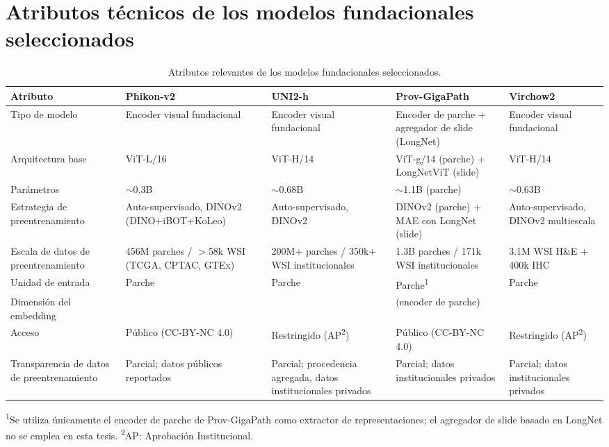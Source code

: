 \chapter{Atributos técnicos de los modelos fundacionales seleccionados}
\label{apx:atributos_modelos}

\begin{table}[htbp]
\centering
\caption{Atributos relevantes de los modelos fundacionales seleccionados.}
\label{tab:atributos_modelos}
\small
\begin{tabularx}{\textwidth}{>{\raggedright\arraybackslash}p{2.2cm} >{\raggedright\arraybackslash}X >{\raggedright\arraybackslash}X >{\raggedright\arraybackslash}X >{\raggedright\arraybackslash}X}
\toprule
\textbf{Atributo} & \textbf{Phikon-v2} & \textbf{UNI2-h} & \textbf{Prov-GigaPath} & \textbf{Virchow2} \\
\midrule
Tipo de modelo & Encoder visual fundacional & Encoder visual fundacional & Encoder de parche + agregador de slide (LongNet) & Encoder visual fundacional \\
Arquitectura base & ViT-L/16 & ViT-H/14 & ViT-g/14 (parche) + LongNetViT (slide) & ViT-H/14 \\
Parámetros & $\sim$0.3B & $\sim$0.68B & $\sim$1.1B (parche) & $\sim$0.63B \\
Estrategia de preentrenamiento & Auto-supervisado, DINOv2 (DINO+iBOT+KoLeo) & Auto-supervisado, DINOv2 & DINOv2 (parche) + MAE con LongNet (slide) & Auto-supervisado, DINOv2 multiescala \\
Escala de datos de preentrenamiento & 456M parches / $>$58k WSI (TCGA, CPTAC, GTEx) & 200M+ parches / 350k+ WSI institucionales & 1.3B parches / 171k WSI institucionales & 3.1M WSI H\&E + 400k IHC \\
Unidad de entrada & Parche & Parche & Parche\textsuperscript{1} & Parche \\
Dimensión del embedding & 1024 & 1536 & 1536 (encoder de parche) & 2560 \\
Acceso & Público (CC-BY-NC 4.0) & Restringido (AP\textsuperscript{2}) & Público (CC-BY-NC 4.0) & Restringido (AP\textsuperscript{2})\\
Transparencia de datos de preentrenamiento & Parcial; datos públicos reportados & Parcial; procedencia agregada, datos institucionales privados & Parcial; datos institucionales privados & Parcial; datos institucionales privados \\
\bottomrule
\end{tabularx}
\begin{flushleft}
\footnotesize{\textsuperscript{1}Se utiliza únicamente el encoder de parche de Prov-GigaPath como extractor de representaciones; el agregador de slide basado en LongNet no se emplea en esta tesis.}
\footnotesize{\textsuperscript{2}AP: Aprobación Institucional.}
\end{flushleft}
\end{table}
